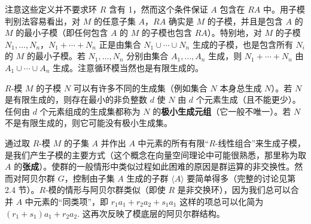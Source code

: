 注意这些定义并不要求环 \(R\) 含有 1，然而这个条件保证 \(A\) 包含在 \(RA\) 中。用子模判别法容易看出，对 \(M\) 的任意子集 \(A\)，\(RA\) 确实是 \(M\) 的子模，并且是包含 \(A\) 的 \(M\) 的最小子模（即任何包含 \(A\) 的 \(M\) 的子模也包含 \(RA\)）。特别地，对 \(M\) 的子模 \(N_1, \ldots, N_n\)，\(N_1+\cdots+N_n\) 正是由集合 \(N_1 \cup \cdots \cup N_n\) 生成的子模，也是包含所有 \(N_i\) 的 \(M\) 的最小子模。若 \(N_1, \ldots, N_n\) 分别由集合 \(A_1, \ldots, A_n\) 生成，则 \(N_1+\cdots+N_n\) 由 \(A_1 \cup \cdots \cup A_n\) 生成。注意循环模当然也是有限生成的。

\(R\)-模 \(M\) 的子模 \(N\) 可以有许多不同的生成集（例如集合 \(N\) 本身总生成 \(N\)）。若 \(N\) 是有限生成的，则存在最小的非负整数 \(d\) 使 \(N\) 由 \(d\) 个元素生成（且不能更少）。任何由 \(d\) 个元素组成的生成集都称为 \(N\) 的\textbf{极小生成元组}（它一般不唯一）。若 \(N\) 不是有限生成的，则它可能没有极小生成集。

通过取 \(R\)-模 \(M\) 的子集 \(A\) 并作出 \(A\) 中元素的所有有限“\(R\)-线性组合”来生成子模，是我们产生子模的主要方式（这个概念在向量空间理论中可能很熟悉，那里称为取 \(A\) 的\textbf{张成}）。使群的一般情形中类似过程如此困难的原因是群运算的非交换性。然而对阿贝尔群 \(G\)，控制由子集 \(A\) 生成的子群 \(\langle A \rangle\) 要简单得多（完整的讨论见第 2.4 节）。\(R\)-模的情形与阿贝尔群类似（即使 \(R\) 是非交换环），因为我们总可以合并 \(A\) 中元素的“同类项”，即 \(r_1a_1+r_2a_2+s_1a_1\) 这样的项总可以化简为 \((r_1+s_1)a_1+r_2a_2\). 这再次反映了模底层的阿贝尔群结构。


